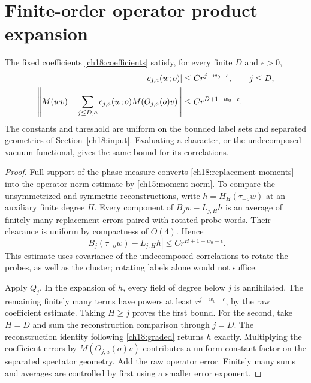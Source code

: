 

\section{Finite-order operator product expansion}
\label{ch18:ope}

\begin{theorem}
\label{ch18:ope-theorem}
The fixed coefficients
\eqref{ch18:coefficients} satisfy, for every finite $D$ and
$\epsilon>0$,
\begin{align}
 |c_{j,a}(w;o)|&\le C r^{j-w_0-\epsilon},\qquad j\le D,\notag\\
 \left\|M(wv)-\sum_{j\le D,a}c_{j,a}(w;o)
                        M(O_{j,a}(o)v)\right\|
      &\le C r^{D+1-w_0-\epsilon}.
 \label{ch18:ope-bound}
\end{align}
The constants and threshold are uniform on the bounded label sets and
separated geometries of Section~\ref{ch18:input}. Evaluating a character,
or the undecomposed vacuum functional, gives the same bound for its correlations.
\end{theorem}
\begin{proof}
Full support of the phase measure converts
\eqref{ch18:replacement-moments} into the operator-norm estimate by
\eqref{ch15:moment-norm}. To compare the unsymmetrized and symmetric reconstructions,
write $h=H_H(\tau_{-o}w)$ at an auxiliary finite degree $H$.
Every component of $B_jw-L_{j,H}h$ is an average of finitely many
replacement errors paired with rotated probe words. Their clearance
is uniform by compactness of $O(4)$. Hence
\[
 |B_j(\tau_{-o}w)-L_{j,H}h|
                         \le C r^{H+1-w_0-\epsilon}.
\]
This estimate uses covariance of the undecomposed correlations to rotate the
probes, as well as the cluster; rotating labels alone would not suffice.

Apply $Q_j$. In the expansion of $h$, every field of degree below $j$
is annihilated. The remaining finitely many terms have powers at least
$r^{j-w_0-\epsilon}$, by the raw coefficient estimate. Taking $H\ge j$
proves the first bound. For the second, take $H=D$ and sum the reconstruction
comparison through $j=D$. The reconstruction identity following
\eqref{ch18:graded} returns $h$ exactly. Multiplying the coefficient
errors by $M(O_{j,a}(o)v)$ contributes a uniform constant factor on the separated
spectator geometry. Add the raw operator error. Finitely many sums and
averages are controlled by first using a smaller error exponent.
\end{proof}


